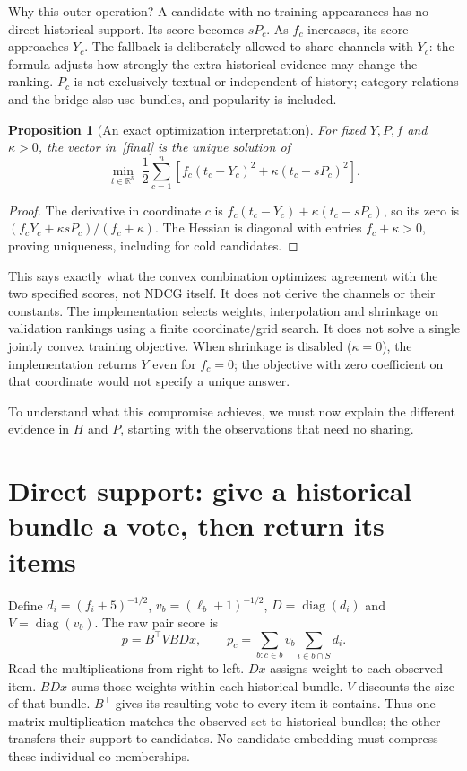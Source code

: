 \documentclass[11pt,a4paper]{article}
\newcommand{\diag}{\operatorname{diag}}
\newtheorem{proposition}{Proposition}
\begin{document}
Why this outer operation? A candidate with no training appearances has no direct
historical support. Its score becomes $sP_c$. As $f_c$ increases, its score
approaches $Y_c$. The fallback is deliberately allowed to share channels with
$Y_c$: the formula adjusts how strongly the extra historical evidence may change
the ranking. $P_c$ is not exclusively textual or independent of history;
category relations and the bridge also use bundles, and popularity is included.

\begin{proposition}[An exact optimization interpretation]\label{objective}
For fixed $Y,P,f$ and $\kappa>0$, the vector in~\eqref{final} is the unique solution of
\begin{equation}\label{energy}
 \min_{t\in\mathbb R^n}\ \frac12\sum_{c=1}^n
       \left[f_c(t_c-Y_c)^2+\kappa(t_c-sP_c)^2\right].
\end{equation}
\end{proposition}
\begin{proof}
The derivative in coordinate $c$ is
$f_c(t_c-Y_c)+\kappa(t_c-sP_c)$, so its zero is
$(f_cY_c+\kappa sP_c)/(f_c+\kappa)$. The Hessian is diagonal with entries
$f_c+\kappa>0$, proving uniqueness, including for cold candidates.
\end{proof}
This says exactly what the convex combination optimizes: agreement with the two
specified scores, not NDCG itself. It does not derive the channels or their
constants. The implementation selects weights, interpolation and shrinkage on
validation rankings using a finite coordinate/grid search. It does not solve a
single jointly convex training objective. When shrinkage is disabled ($\kappa=0$),
the implementation returns $Y$ even for $f_c=0$; the objective with zero coefficient
on that coordinate would not specify a unique answer.

To understand what this compromise achieves, we must now explain the different
evidence in $H$ and $P$, starting with the observations that need no sharing.

\section{Direct support: give a historical bundle a vote, then return its items}
Define $d_i=(f_i+5)^{-1/2}$, $v_b=(\ell_b+1)^{-1/2}$,
$D=\diag(d_i)$ and $V=\diag(v_b)$. The raw pair score is
\begin{equation}\label{pair}
 p=B^\top VBDx,\qquad
 p_c=\sum_{b:c\in b}v_b\sum_{i\in b\cap S}d_i.
\end{equation}
Read the multiplications from right to left. $Dx$ assigns weight to each observed
item. $BDx$ sums those weights within each historical bundle. $V$ discounts the
size of that bundle. $B^\top$ gives its resulting vote to every item it contains.
Thus one matrix multiplication matches the observed set to historical bundles;
the other transfers their support to candidates. No candidate embedding must
compress these individual co-memberships.
\end{document}
